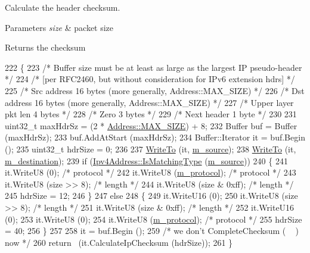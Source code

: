 Calculate the header checksum. 


\begin{DoxyParams}{Parameters}
{\em size} & packet size \\
\hline
\end{DoxyParams}
\begin{DoxyReturn}{Returns}
the checksum 
\end{DoxyReturn}

\begin{DoxyCode}
222 \{
223   \textcolor{comment}{/* Buffer size must be at least as large as the largest IP pseudo-header */}
224   \textcolor{comment}{/* [per RFC2460, but without consideration for IPv6 extension hdrs]      */}
225   \textcolor{comment}{/* Src address            16 bytes (more generally, Address::MAX\_SIZE)   */}
226   \textcolor{comment}{/* Dst address            16 bytes (more generally, Address::MAX\_SIZE)   */}
227   \textcolor{comment}{/* Upper layer pkt len    4 bytes                                        */}
228   \textcolor{comment}{/* Zero                   3 bytes                                        */}
229   \textcolor{comment}{/* Next header            1 byte                                         */}
230 
231   uint32\_t maxHdrSz = (2 * \hyperlink{classns3_1_1Address_a34cb50781c65195ba10651d82d084b4fae450cf1a7cb3df8a05d29b23aecf7f84}{Address::MAX\_SIZE}) + 8;
232   Buffer buf = Buffer (maxHdrSz);
233   buf.AddAtStart (maxHdrSz);
234   Buffer::Iterator it = buf.Begin ();
235   uint32\_t hdrSize = 0;
236 
237   \hyperlink{namespacens3_abe3cb0173e87a3f7e2e414358c0a08bf}{WriteTo} (it, \hyperlink{classns3_1_1TcpHeader_a0babcb8b153019eaa0e477bedf0ae716}{m\_source});
238   \hyperlink{namespacens3_abe3cb0173e87a3f7e2e414358c0a08bf}{WriteTo} (it, \hyperlink{classns3_1_1TcpHeader_a8e272fcbe69041005e319f0e4aa1d5ab}{m\_destination});
239   \textcolor{keywordflow}{if} (\hyperlink{classns3_1_1Ipv4Address_a7129db5e08739783b300976d28c0ced3}{Ipv4Address::IsMatchingType} (\hyperlink{classns3_1_1TcpHeader_a0babcb8b153019eaa0e477bedf0ae716}{m\_source}))
240     \{
241       it.WriteU8 (0); \textcolor{comment}{/* protocol */}
242       it.WriteU8 (\hyperlink{classns3_1_1TcpHeader_a92deaf7af6f6d4fba270fd9979b2a49b}{m\_protocol}); \textcolor{comment}{/* protocol */}
243       it.WriteU8 (size >> 8); \textcolor{comment}{/* length */}
244       it.WriteU8 (size & 0xff); \textcolor{comment}{/* length */}
245       hdrSize = 12;
246     \}
247   \textcolor{keywordflow}{else}
248     \{
249       it.WriteU16 (0);
250       it.WriteU8 (size >> 8); \textcolor{comment}{/* length */}
251       it.WriteU8 (size & 0xff); \textcolor{comment}{/* length */}
252       it.WriteU16 (0);
253       it.WriteU8 (0);
254       it.WriteU8 (\hyperlink{classns3_1_1TcpHeader_a92deaf7af6f6d4fba270fd9979b2a49b}{m\_protocol}); \textcolor{comment}{/* protocol */}
255       hdrSize = 40;
256     \}
257 
258   it = buf.Begin ();
259   \textcolor{comment}{/* we don't CompleteChecksum ( ~ ) now */}
260   \textcolor{keywordflow}{return} ~(it.CalculateIpChecksum (hdrSize));
261 \}
\end{DoxyCode}


